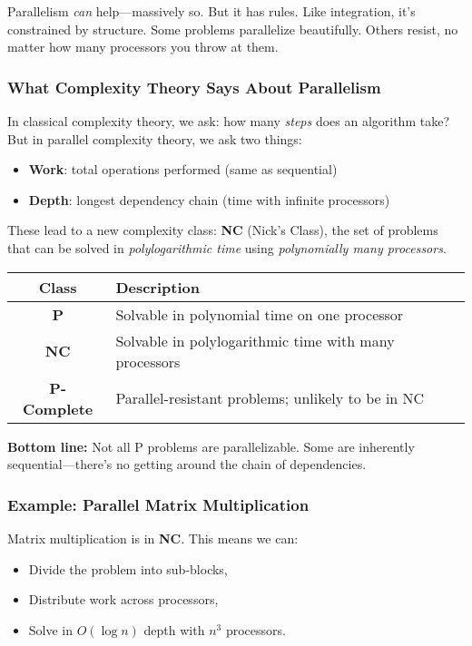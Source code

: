 Parallelism \textit{can} help—massively so. But it has rules. Like integration, it’s constrained by structure. Some problems parallelize beautifully. Others resist, no matter how many processors you throw at them.

\subsubsection{What Complexity Theory Says About Parallelism}

In classical complexity theory, we ask: how many \emph{steps} does an algorithm take? But in parallel complexity theory, we ask two things:

\begin{itemize}
  \item \textbf{Work}: total operations performed (same as sequential)
  \item \textbf{Depth}: longest dependency chain (time with infinite processors)
\end{itemize}

These lead to a new complexity class: \textbf{NC} (Nick’s Class), the set of problems that can be solved in \textit{polylogarithmic time} using \textit{polynomially many processors}.

\begin{center}
\renewcommand{\arraystretch}{1.4}
\begin{tabular}{|c|l|}
\hline
\textbf{Class} & \textbf{Description} \\ \hline
\textbf{P} & Solvable in polynomial time on one processor \\ \hline
\textbf{NC} & Solvable in polylogarithmic time with many processors \\ \hline
\textbf{P-Complete} & Parallel-resistant problems; unlikely to be in NC \\ \hline
\end{tabular}
\end{center}

\textbf{Bottom line:} Not all P problems are parallelizable. Some are inherently sequential—there’s no getting around the chain of dependencies.

\subsubsection{Example: Parallel Matrix Multiplication}

Matrix multiplication is in \textbf{NC}. This means we can:

\begin{itemize}
  \item Divide the problem into sub-blocks,
  \item Distribute work across processors,
  \item Solve in \( O(\log n) \) depth with \( n^3 \) processors.
\end{itemize}

